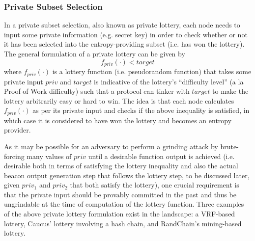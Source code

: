 \documentclass[letterpaper,twocolumn,10pt]{article}
\theoremstyle{definition}
\theoremstyle{remark}
\begin{document}
\subsubsection{Private Subset Selection}
\label{subsubsection:private-subset-selection}
In a private subset selection, also known as private lottery, each node needs to input some private information (e.g. secret key) in order to check whether or not it has been selected into the entropy-providing subset (i.e. has won the lottery). The general formulation of a private lottery can be given by
\[
f_{priv}(\cdot) < target
\]
where $f_{priv}(\cdot)$ is a lottery function (i.e. pseudorandom function) that takes some private input $priv$ and $target$ is indicative of the lottery's ``difficulty level'' (a la Proof of Work difficulty) such that a protocol can tinker with $target$ to make the lottery arbitrarily easy or hard to win. The idea is that each node calculates $f_{priv}(\cdot)$ as per its private input and checks if the above inequality is satisfied, in which case it is considered to have won the lottery and becomes an entropy provider.

As it may be possible for an adversary to perform a grinding attack by brute-forcing many values of $priv$ until a desirable function output is achieved (i.e. desirable both in terms of satisfying the lottery inequality and also the actual beacon output generation step that follows the lottery step, to be discussed later, given $priv_1$ and $priv_2$ that both satisfy the lottery), one crucial requirement is that the private input should be provably committed in the past and thus be ungrindable at the time of computation of the lottery function. Three examples of the above private lottery formulation exist in the landscape: a VRF-based lottery, Caucus' \cite{azouvi2018winning} lottery involving a hash chain, and RandChain's \cite{han2020randchain} mining-based lottery.\\
\end{document}
